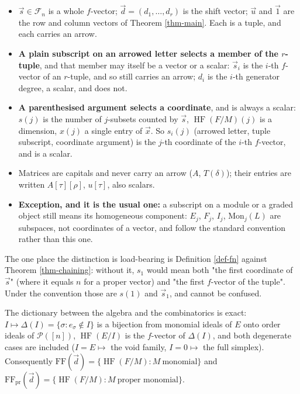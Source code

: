 \documentclass[11pt, a4paper, abstract=yes]{scrartcl}
\theoremstyle{definition}
\theoremstyle{remark}
\theoremstyle{plain}
\newcommand{\HF}{\operatorname{HF}}
\begin{document}
\begin{itemize}
\item \(\vec s\in\mathcal F_n\) is a whole \(f\)-vector; \(\vec d=(d_1,\dots,d_r)\) is the shift vector;
\(\vec u\) and \(\vec 1\) are the row and column vectors of Theorem \ref{thm-main}. Each is a tuple, and
each carries an arrow.
\item \textbf{A plain subscript on an arrowed letter selects a member of the \(r\)-tuple}, and that member may
itself be a vector or a scalar: \(\vec s_i\) is the \(i\)-th \(f\)-vector of an \(r\)-tuple, and so
still carries an arrow; \(d_i\) is the \(i\)-th generator degree, a scalar, and does not.
\item \textbf{A parenthesised argument selects a coordinate}, and is always a scalar: \(s(j)\) is the number of
\(j\)-subsets counted by \(\vec s\), \(\HF(F/M)(j)\) is a dimension, \(x(j)\) a single entry of
\(\vec x\). So \(s_i(j)\) (arrowed letter, tuple subscript, coordinate argument) is the
\(j\)-th coordinate of the \(i\)-th \(f\)-vector, and is a scalar.
\item Matrices are capitals and never carry an arrow (\(A\), \(T(\delta)\)); their entries are written
\(A[\tau][\rho]\), \(u[\tau]\), also scalars.
\item \textbf{Exception, and it is the usual one:} a subscript on a module or a graded object still means its
homogeneous component: \(E_j\), \(F_j\), \(I_j\), \(\mathrm{Mon}_j(L)\) are subspaces, not
coordinates of a vector, and follow the standard convention rather than this one.
\end{itemize}

The one place the distinction is load-bearing is Definition \ref{def-fn} against
Theorem \ref{thm-chaining}: without it, \(s_1\) would mean both "the first coordinate of \(\vec s\)"
(where it equals \(n\) for a proper vector) and "the first \(f\)-vector of the tuple". Under the
convention those are \(s(1)\) and \(\vec s_1\), and cannot be confused.

The dictionary between the algebra and the combinatorics is exact: \(I\mapsto\Delta(I)=\lbrace\sigma:
e_\sigma\notin I\rbrace\) is a bijection from monomial ideals of \(E\) onto order ideals of \(\mathcal P([n])\),
\(\HF(E/I)\) is the \(f\)-vector of \(\Delta(I)\), and both degenerate cases are included
(\(I=E\mapsto\) the void family, \(I=0\mapsto\) the full simplex). Consequently
\(\mathrm{FF}(\vec d)=\lbrace\HF(F/M):M\ \text{monomial}\rbrace\) and
\(\mathrm{FF}_{\mathrm{pr}}(\vec d)=\lbrace\HF(F/M):M\ \text{proper monomial}\rbrace\).
\end{document}
